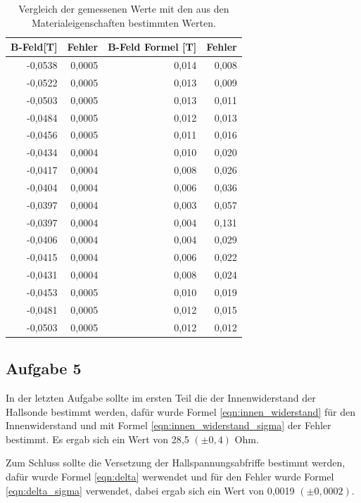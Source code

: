\documentclass[12pt]{scrartcl}
\begin{document}
\begin{table}[htbp]
\caption{Vergleich der gemessenen Werte mit den aus den Materialeigenschaften bestimmten Werten.}
\begin{center}
\begin{tabular}{|r|r|r|r|}
\hline
\multicolumn{1}{|l|}{B-Feld[T]} & Fehler & \multicolumn{1}{l|}{B-Feld Formel [T]} & \multicolumn{1}{l|}{Fehler} \\ \hline
-0,0538 & 0,0005 & 0,014 & 0,008 \\ \hline
-0,0522 & 0,0005 & 0,013 & 0,009 \\ \hline
-0,0503 & 0,0005 & 0,013 & 0,011 \\ \hline
-0,0484 & 0,0005 & 0,012 & 0,013 \\ \hline
-0,0456 & 0,0005 & 0,011 & 0,016 \\ \hline
-0,0434 & 0,0004 & 0,010 & 0,020 \\ \hline
-0,0417 & 0,0004 & 0,008 & 0,026 \\ \hline
-0,0404 & 0,0004 & 0,006 & 0,036 \\ \hline
-0,0397 & 0,0004 & 0,003 & 0,057 \\ \hline
-0,0397 & 0,0004 & 0,004 & 0,131 \\ \hline
-0,0406 & 0,0004 & 0,004 & 0,029 \\ \hline
-0,0415 & 0,0004 & 0,006 & 0,022 \\ \hline
-0,0431 & 0,0004 & 0,008 & 0,024 \\ \hline
-0,0453 & 0,0005 & 0,010 & 0,019 \\ \hline
-0,0481 & 0,0005 & 0,012 & 0,015 \\ \hline
-0,0503 & 0,0005 & 0,012 & 0,012 \\ \hline
\end{tabular}
\end{center}
\label{aufgabe_4}
\end{table}

\subsection{Aufgabe 5}
In der letzten Aufgabe sollte im ersten Teil die der Innenwiderstand der Hallsonde bestimmt werden, dafür wurde Formel \ref{eqn:innen_widerstand} für den Innenwiderstand und mit Formel \ref{eqn:innen_widerstand_sigma} der Fehler bestimmt. Es ergab sich ein Wert von 28,5 $(\pm 0,4)$ Ohm.

Zum Schluss sollte die Versetzung der Hallspannungsabfriffe bestimmt werden, dafür wurde Formel \ref{eqn:delta} werwendet und für den Fehler wurde Formel \ref{eqn:delta_sigma} verwendet, dabei ergab sich ein Wert von 0,0019 $(\pm 0,0002)$.
\end{document}
